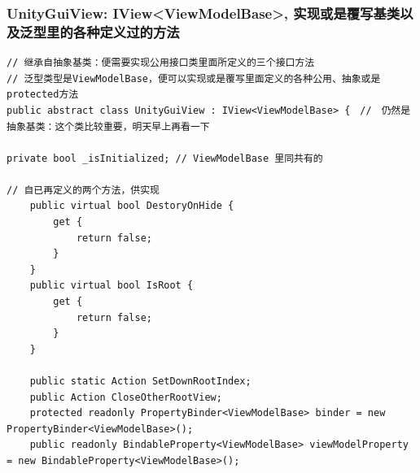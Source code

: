 \documentclass[9pt, b5paper]{article}
\begin{document}
\subsubsection{UnityGuiView: IView<ViewModelBase>, 实现或是覆写基类以及泛型里的各种定义过的方法}
\label{sec-6-4-2}
\begin{verbatim}
// 继承自抽象基类：便需要实现公用接口类里面所定义的三个接口方法
// 泛型类型是ViewModelBase，便可以实现或是覆写里面定义的各种公用、抽象或是protected方法
public abstract class UnityGuiView : IView<ViewModelBase> {　//　仍然是抽象基类：这个类比较重要，明天早上再看一下

private bool _isInitialized; // ViewModelBase 里同共有的

// 自已再定义的两个方法，供实现
    public virtual bool DestoryOnHide {
        get {
            return false;
        }
    }
    public virtual bool IsRoot {
        get {
            return false;
        }
    }

    public static Action SetDownRootIndex;
    public Action CloseOtherRootView;
    protected readonly PropertyBinder<ViewModelBase> binder = new PropertyBinder<ViewModelBase>();
    public readonly BindableProperty<ViewModelBase> viewModelProperty = new BindableProperty<ViewModelBase>();


\end{verbatim}
\end{document}
